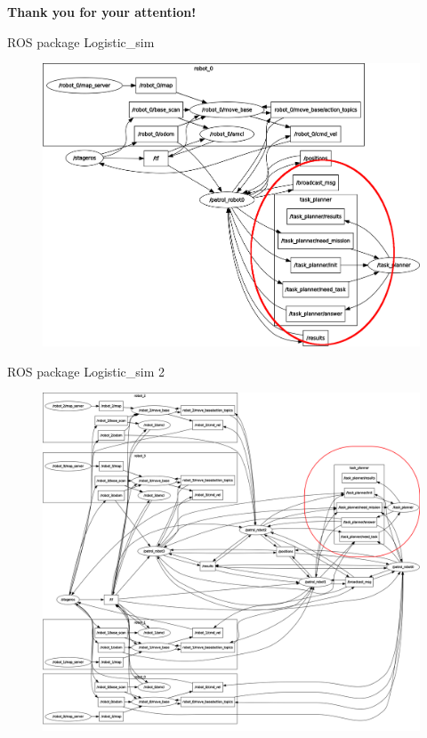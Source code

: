     \begin{frame}
        \begin{center}
        {\bf Thank you for your attention!}
        \end{center}
    \end{frame}

    \begin{frame}[fragile]{ROS package Logistic\_sim}
        \begin{figure}[hbt]
            \centering
            \includegraphics[scale=0.25]{img/rosgraph}
        \end{figure}
    \end{frame}

    \begin{frame}[fragile]{ROS package Logistic\_sim 2}
        \begin{figure}[hbt]
            \centering
            \includegraphics[scale=0.12]{img/rosgraph1}
        \end{figure}
    \end{frame}

